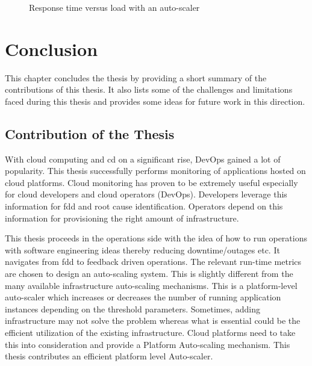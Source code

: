 \documentclass[article,type=msc,colorback,12pt,accentcolor=tud8b,table]{tudthesis}
\begin{document}
      \begin{figure}[H]
      	\begin{center}
      		\makebox[\textwidth]{\texttt{[image: E16]}}
      	\end{center}
      	\caption{Response time versus load with an auto-scaler}
      		\label{fig:with_autoscaler}
      \end{figure}

\cleardoublepage

 \hfill 
\section{Conclusion}	 
	 \hfill \break

This chapter concludes the thesis by providing a short summary of the contributions of this thesis. It also lists some of the challenges and limitations faced during this thesis and provides some ideas for future work in this direction.
 
\subsection{Contribution of the Thesis}

With cloud computing and \gls{cd} on a significant rise, DevOps gained a lot of popularity. This thesis successfully performs monitoring of applications hosted on cloud platforms. Cloud monitoring has proven to be extremely useful especially for cloud developers and cloud operators (DevOps). Developers leverage this information for \gls{fdd} and root cause identification. Operators depend on this information for provisioning the right amount of infrastructure.

This thesis proceeds in the operations side with the idea of how to run operations with software engineering ideas thereby reducing downtime/outages etc. It navigates from \gls{fdd} to feedback driven operations. The relevant run-time metrics are chosen to design an auto-scaling system. This is slightly different from the many available infrastructure auto-scaling mechanisms. This is a platform-level auto-scaler which increases or decreases the number of running application instances depending on the threshold parameters. Sometimes, adding infrastructure may not solve the problem whereas what is essential could be the efficient utilization of the existing infrastructure. Cloud platforms need to take this into consideration and provide a Platform Auto-scaling mechanism. This thesis contributes an efficient platform level Auto-scaler. 
\end{document}
